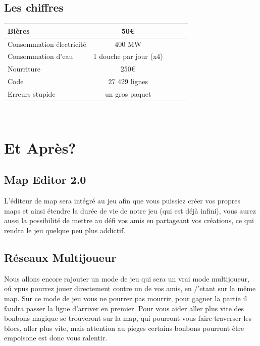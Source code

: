 \documentclass [11pt]{report}
\begin{document}
	\vspace{10mm}
	
	\section{Les chiffres}
	\vspace{8mm}
		\begin{center}
				\begin{tabular}{| l |*{4} {c|}}
				\hline
				Bières & 50€ \\
				\hline
				Consommation électricité & 400 MW  \\
				\hline
				Consommation d'eau & 1 douche par jour (x4)  \\
				\hline
				Nourriture & 250€ \\
				\hline
				Code & 27 429 lignes  \\
				\hline
				Erreurs stupide & un gros paquet  \\
				\hline
					
				\end{tabular}\\\vspace{3mm}
		\end{center}
	
	
\chapter{Et Après?}
	\section{Map Editor 2.0}
	L'éditeur de map sera intégré au jeu afin que vous puissiez créer vos propres maps et ainsi étendre la durée de vie de notre jeu (qui est déjà infini), vous aurez aussi la possibilité de mettre au défi vos amis en partageant vos créations, ce qui rendra le jeu quelque peu plus addictif.
	
	
		
		\vspace{10mm}
	
	
	
	\section{Réseaux Multijoueur}
	Nous allons encore rajouter un mode de jeu qui sera un vrai mode multijoueur, o\'u vpus pourrez jouer directement contre un de vos amis, en /'etant sur la m\^eme map. Sur ce mode de jeu vous ne pourrez pas mourrir, pour gagner la partie il faudra passer la ligne d'arriver en premier. Pour vous aider aller plus vite des bonbons magique se trouveront sur la map, qui pourront vous faire traverser les blocs, aller plus vite, mais attention au pieges certains bonbons pourront \^etre empoisone est donc vous ralentir.
\end{document}
